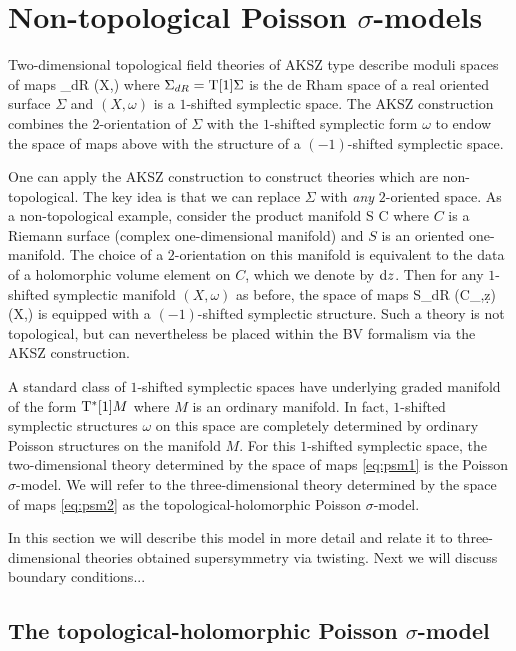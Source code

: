 \documentclass[../main.tex]{subfiles}
\begin{document}
 

\section{Non-topological Poisson $\sigma$-models}

Two-dimensional topological field theories of AKSZ type describe moduli spaces of maps
\beqn
\label{eq:psm1}
\Sigma_{dR} \to (X,\omega)
\eeqn
where $\Sigma_{dR} = {\rm T}[1] \Sigma$ is the de Rham space of a real oriented surface $\Sigma$ and $(X,\omega)$ is a $1$-shifted symplectic space.
The AKSZ construction combines the $2$-orientation of $\Sigma$ with the $1$-shifted symplectic form $\omega$ to endow the space of maps above with the structure of a $(-1)$-shifted symplectic space.

One can apply the AKSZ construction to construct theories which are non-topological.
The key idea is that we can replace $\Sigma$ with \textit{any} $2$-oriented space.
As a non-topological example, consider the product manifold
\beqn
S \times C
\eeqn
where $C$ is a Riemann surface (complex one-dimensional manifold) and $S$ is an oriented one-manifold.
The choice of a $2$-orientation on this manifold is equivalent to the data of a holomorphic volume element on $C$, which we denote by ${\rm d} z$.
Then for any $1$-shifted symplectic manifold $(X,\omega)$ as before, the space of maps
\beqn\label{eq:psm2}
S_{dR} \times (C_{\dbar},\d z) \to (X,\omega)
\eeqn
is equipped with a $(-1)$-shifted symplectic structure.
Such a theory is not topological, but can nevertheless be placed within the BV formalism via the AKSZ construction.

A standard class of $1$-shifted symplectic spaces have underlying graded manifold of the form ${\rm T}^* [1] M$ where $M$ is an ordinary manifold.
In fact, $1$-shifted symplectic structures $\omega$ on this space are completely determined by ordinary Poisson structures on the manifold $M$.
For this $1$-shifted symplectic space, the two-dimensional theory determined by the space of maps \eqref{eq:psm1} is the Poisson $\sigma$-model.
We will refer to the three-dimensional theory determined by the space of maps \eqref{eq:psm2} as the topological-holomorphic Poisson $\sigma$-model.

In this section we will describe this model in more detail and relate it to three-dimensional theories obtained supersymmetry via twisting.
Next we will discuss boundary conditions...

\subsection{The topological-holomorphic Poisson $\sigma$-model}
\end{document}
